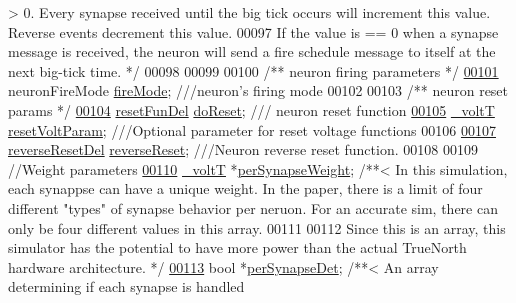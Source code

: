 \begin{DoxyCode}
{       > 0. Every synapse received until the big tick occurs will increment this value. Reverse events decrement
       this value.}
00097 \textcolor{comment}{        If the value is == 0 when a synapse message is received, the neuron will send a fire schedule
       message to itself at the next big-tick time. */}
00098 
00099 
00100     \textcolor{comment}{/** neuron firing parameters */}
\hypertarget{neuron_8h_source_l00101}{}\hyperlink{structneuron_state_a55890f9e021064df30e9d18a9df98845}{00101}     neuronFireMode \hyperlink{structneuron_state_a55890f9e021064df30e9d18a9df98845}{fireMode}; \textcolor{comment}{///neuron's firing mode}
00102 
00103         \textcolor{comment}{/** neuron reset params */}
\hypertarget{neuron_8h_source_l00104}{}\hyperlink{structneuron_state_afcf9d931e4fda519c43b4efeab687463}{00104}     \hyperlink{neuron_8h_ae7e5990745cd949246894bfb633ca4a2}{resetFunDel} \hyperlink{structneuron_state_afcf9d931e4fda519c43b4efeab687463}{doReset}; \textcolor{comment}{/// neuron reset function}
\hypertarget{neuron_8h_source_l00105}{}\hyperlink{structneuron_state_add87cc0b2bc3426f0fd870f7df6decd5}{00105}     \hyperlink{assist_8h_abe1fc1b8f9efd1187e564bcb8de7f815}{\_voltT} \hyperlink{structneuron_state_add87cc0b2bc3426f0fd870f7df6decd5}{resetVoltParam}; \textcolor{comment}{///Optional parameter for reset voltage functions}
00106 
\hypertarget{neuron_8h_source_l00107}{}\hyperlink{structneuron_state_abf6970098695585c81e101b2a741b9a5}{00107}     \hyperlink{neuron_8h_aa939c0acc5b3367975f2f0cb7bc36d17}{reverseResetDel} \hyperlink{structneuron_state_abf6970098695585c81e101b2a741b9a5}{reverseReset}; \textcolor{comment}{///Neuron reverse reset function.}
00108 
00109         \textcolor{comment}{//Weight parameters}
\hypertarget{neuron_8h_source_l00110}{}\hyperlink{structneuron_state_ab39656a1580505adcabc4c7a1f4d8100}{00110}     \hyperlink{assist_8h_abe1fc1b8f9efd1187e564bcb8de7f815}{\_voltT} *\hyperlink{structneuron_state_ab39656a1580505adcabc4c7a1f4d8100}{perSynapseWeight}; \textcolor{comment}{/**< In this simulation, each synappse can
       have a unique weight. In the paper, there is a limit of four different "types" of synapse behavior per neruon.
       For an accurate sim, there can only be four different values in this array.}
00111 \textcolor{comment}{}
00112 \textcolor{comment}{        Since this is an array, this simulator has the potential to have more power than the actual
       TrueNorth hardware architecture. */}
\hypertarget{neuron_8h_source_l00113}{}\hyperlink{structneuron_state_a95688135a244a3ce3b35698a49d0da18}{00113}     \textcolor{keywordtype}{bool} *\hyperlink{structneuron_state_a95688135a244a3ce3b35698a49d0da18}{perSynapseDet}; \textcolor{comment}{/**< An array determining if each synapse is handled
}
\end{DoxyCode}
